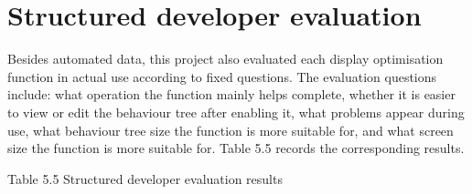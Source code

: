 \documentclass[11pt,a4paper,oneside,extrafontsizes]{memoir}
\begin{document}
\section{Structured developer evaluation}

Besides automated data, this project also evaluated each display optimisation function in actual use according to fixed questions. The evaluation questions include: what operation the function mainly helps complete, whether it is easier to view or edit the behaviour tree after enabling it, what problems appear during use, what behaviour tree size the function is more suitable for, and what screen size the function is more suitable for. Table 5.5 records the corresponding results.

Table 5.5 Structured developer evaluation results

\begin{center}


\end{center}
\end{document}
